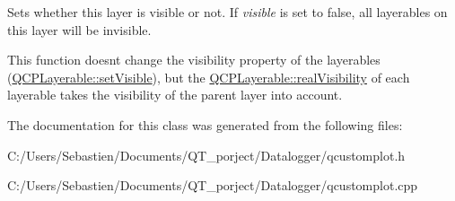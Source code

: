 Sets whether this layer is visible or not. If {\itshape visible} is set to false, all layerables on this layer will be invisible.

This function doesn\textquotesingle{}t change the visibility property of the layerables (\hyperlink{class_q_c_p_layerable_a3bed99ddc396b48ce3ebfdc0418744f8}{Q\+C\+P\+Layerable\+::set\+Visible}), but the \hyperlink{class_q_c_p_layerable_ab054e88f15d485defcb95e7376f119e7}{Q\+C\+P\+Layerable\+::real\+Visibility} of each layerable takes the visibility of the parent layer into account. 

The documentation for this class was generated from the following files\+:\begin{DoxyCompactItemize}
\item 
C\+:/\+Users/\+Sebastien/\+Documents/\+Q\+T\+\_\+porject/\+Datalogger/qcustomplot.\+h\item 
C\+:/\+Users/\+Sebastien/\+Documents/\+Q\+T\+\_\+porject/\+Datalogger/qcustomplot.\+cpp\end{DoxyCompactItemize}
